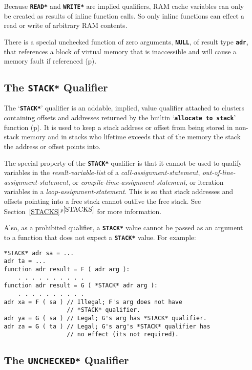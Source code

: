 \documentclass[12pt]{article}
\makeatletter
\newcommand{\TT}[1]{{\tt \bfseries #1}}
\newcommand{\ttakey}[1]{\TT{*#1*}\index{#1@{\tt *#1*}}}
\newcommand{\itemref}[1]{\ref{#1}$^{p\pageref{#1}}$}
\newcommand{\pagref}[1]{p\pageref{#1}}
\newenvironment{indpar}[1][0.3in]%
	{\begin{list}{}%
		     {\setlength{\itemsep}{0in}%
		      \setlength{\topsep}{0in}%
		      \setlength{\parsep}{1ex}%
		      \setlength{\labelwidth}{#1}%
		      \setlength{\leftmargin}{#1}%
		      \addtolength{\leftmargin}{\labelsep}}%
	 \item}%
	{\end{list}}
\makeatother
\begin{document}
Because \TT{*READ*} and \TT{*WRITE*} are implied qualifiers,
RAM cache variables can only be created as
results of inline function calls.
So only inline functions can effect a read or write
of arbitrary RAM contents.

There is a special unchecked function of zero arguments, \TT{NULL}, of result
type \TT{adr}, that
references a block of virtual memory that is
inaccessible and will cause a memory fault if referenced
(\pagref{NULL}).


\subsection{The \TT{*STACK*} Qualifier}
\label{THE-STACK-QUALIFIER}

The `\ttakey{STACK}' qualifier is an addable,
implied, value qualifier
attached to clusters containing offsets and addresses
returned by the builtin `\TT{allocate to stack}'
function (\pagref{ALLOCATE-TO-STACK}).
It is used to keep a stack address or offset from being stored in
non-stack memory and in stacks who lifetime exceeds that of the
memory the stack the address or offset points into.

The special property of the \TT{*STACK*} qualifier is that it cannot
be used to qualify variables in the {\em result-variable-list}
of a {\em call-assignment-statement},
{\em out-of-line-assignment-statement}, or
{\em compile-time-assignment-statement},
or iteration variables in a {\em loop-assignment-statement}.
This is so that stack addresses and offsets pointing into a free stack
cannot outlive the free stack.
See Section~\itemref{STACKS} for more information.

Also, as a prohibited qualifier, a \TT{*STACK*} value cannot be
passed as an argument to a function that does not expect a
\TT{*STACK*} value.  For example:
\begin{indpar}\begin{verbatim}
*STACK* adr sa = ...
adr ta = ...
function adr result = F ( adr arg ):
    . . . . . . . . . .
function adr result = G ( *STACK* adr arg ):
    . . . . . . . . . .
adr xa = F ( sa ) // Illegal; F's arg does not have
                  // *STACK* qualifier.
adr ya = G ( sa ) // Legal; G's arg has *STACK* qualifier.
adr za = G ( ta ) // Legal; G's arg's *STACK* qualifier has
                  // no effect (its not required).
\end{verbatim}\end{indpar}

\subsection{The \TT{*UNCHECKED*} Qualifier}
\label{THE-UNCHECKED-QUALIFIER}
\end{document}
